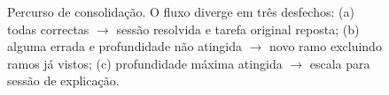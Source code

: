 \begin{figure}[H]
	\caption[Sequ\^encia do percurso de consolida\c{c}\~ao]{Percurso de consolida\c{c}\~ao. O fluxo diverge em tr\^es desfechos: (a) todas correctas $\to$ sess\~ao resolvida e tarefa original reposta; (b) alguma errada e profundidade n\~ao atingida $\to$ novo ramo excluindo ramos j\'a vistos; (c) profundidade m\'axima atingida $\to$ escala para sess\~ao de explica\c{c}\~ao.}
	\label{fig:seq-struggle}
\end{figure}

